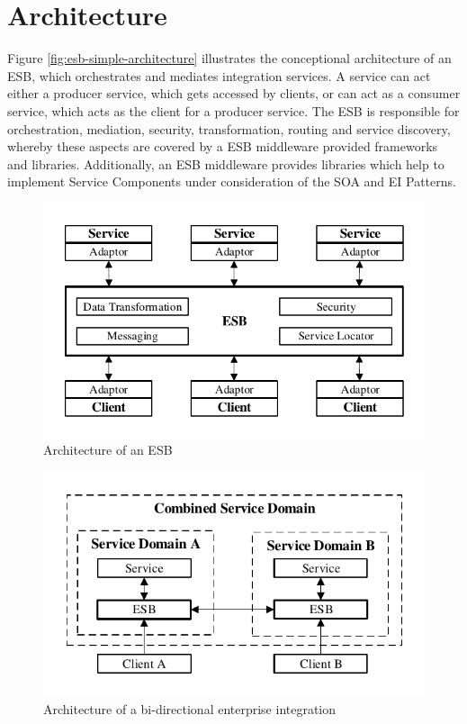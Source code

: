\section{Architecture}
\label{sec:esb-architecture}
Figure \vref{fig:esb-simple-architecture} illustrates the conceptional architecture of an ESB, which orchestrates and mediates integration services. A service can act either a producer service, which gets accessed by clients, or can act as a consumer service, which acts as the client for a producer service. The ESB is responsible for orchestration, mediation, security, transformation, routing and service discovery, whereby these aspects are covered by a ESB middleware provided frameworks and libraries. Additionally, an ESB middleware provides libraries which help to implement Service Components under consideration of the SOA and EI Patterns\cite{EsbSoa2018, MediationESB2005}.

\begin{figure}[htbp]
	\centering
	\includegraphics[scale=1]{images/esb-simple-architecture.pdf}
	\caption{Architecture of an ESB}
	\label{fig:esb-simple-architecture}
\end{figure} 

\begin{figure}[htbp]
	\centering
	\includegraphics[scale=1]{images/esb-bidirectional-integration.pdf}
	\caption{Architecture of a bi-directional enterprise integration}
	\label{fig:esb-bidirectional-integration}
\end{figure} 

